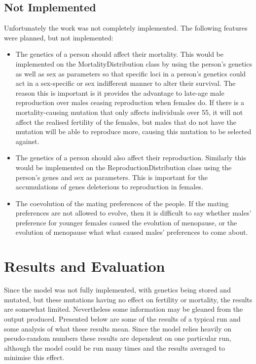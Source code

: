 \documentclass[authoryearcitations]{UoYCSproject}
\begin{document}
\section{Not Implemented}
Unfortunately the work was not completely implemented. The following features were planned, but not implemented:

\begin{itemize}
\item The genetics of a person should affect their mortality. This would be implemented on the MortalityDistribution class by using the person's genetics as well as sex as parameters so that specific loci in a person's genetics could act in a sex-specific or sex indifferent manner to alter their survival. The reason this is important is it provides the advantage to late-age male reproduction over males ceasing reproduction when females do. If there is a mortality-causing mutation that only affects individuals over 55, it will not affect the realised fertility of the females, but males that do not have the mutation will be able to reproduce more, causing this mutation to be selected against.
\item The genetics of a person should also affect their reproduction. Similarly this would be implemented on the ReproductionDistribution class using the person's genes and sex as parameters. This is important for the accumulations of genes deleterious to reproduction in females.
\item The coevolution of the mating preferences of the people. If the mating preferences are not allowed to evolve, then it is difficult to say whether males' preference for younger females caused the evolution of menopause, or the evolution of menopause what what caused males' preferences to come about. 
\end{itemize}


\chapter{Results and Evaluation}
\label{cha:Results and Evaluation}
Since the model was not fully implemented, with genetics being stored and mutated, but these mutations having no effect on fertility or mortality, the results are somewhat limited. Nevertheless some information may be gleaned from the output produced. Presented below are some of the results of a typical run and some analysis of what these results mean. Since the model relies heavily on pseudo-random numbers these results are dependent on one particular run, although the model could be run many times and the results averaged to minimise this effect.
\end{document}
